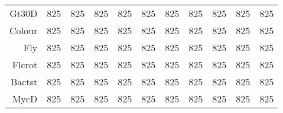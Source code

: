 \begin{table}[p]
\begin{tabular}{rrrrrrrrrrr}
  Gt30D & 825 & 825 & 825 & 825 & 825 & 825 & 825 & 825 & 825 & 825 \\ 
  Colour & 825 & 825 & 825 & 825 & 825 & 825 & 825 & 825 & 825 & 825 \\ 
  Fly & 825 & 825 & 825 & 825 & 825 & 825 & 825 & 825 & 825 & 825 \\ 
  Flcrot & 825 & 825 & 825 & 825 & 825 & 825 & 825 & 825 & 825 & 825 \\ 
  Bactst & 825 & 825 & 825 & 825 & 825 & 825 & 825 & 825 & 825 & 825 \\ 
  MycD & 825 & 825 & 825 & 825 & 825 & 825 & 825 & 825 & 825 & 825 \\ 
   \hline
\end{tabular}
\normalsize
\end{table}
